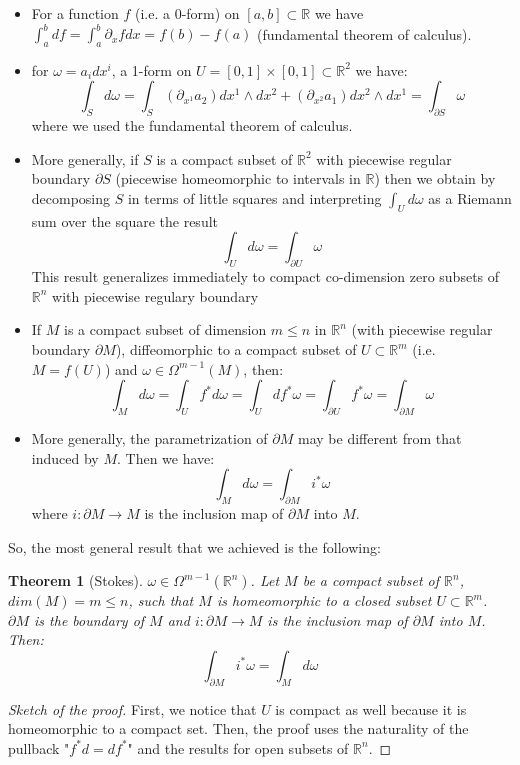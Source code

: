 \documentclass[a4paper,11pt,titlepage, article, oneside]{memoir}
\numberwithin{equation}{section}
\newtheorem{theorem}{Theorem}[section]
\theoremstyle{definition}
\theoremstyle{remark}
\newcommand{\rfield}{\mathbb{R}}
\begin{document}
\begin{itemize}
  \item For a function $f$ (i.e. a 0-form) on $[a, b] \subset \rfield$ we have $\int_a^b df = \int_a^b \partial_x f dx = f(b) - f(a)$ (fundamental theorem of calculus).
  \item for $\omega = a_i dx^i$, a 1-form on $U = [0, 1] \times [0, 1] \subset \rfield^2$ we have:
  $$\int_S d\omega = \int_S (\partial_{x^1} a_2) dx^1 \wedge dx^2 + (\partial_{x^2} a_1) dx^2 \wedge dx^1 = \int_{\partial S} \omega$$
  where we used the fundamental theorem of calculus.
  \item More generally, if $S$ is a compact subset of $\rfield^2$ with piecewise regular boundary $\partial S$ (piecewise homeomorphic to intervals in $\rfield$) then we obtain by decomposing $S$ in terms of little squares and interpreting $\int_U d\omega$ as a Riemann sum over the square the result
  $$\int_U d\omega = \int_{\partial U} \omega$$
  This result generalizes immediately to compact co-dimension zero subsets of $\rfield^n$ with piecewise regulary boundary
  \item If $M$ is a compact subset of dimension $m \le n$ in $\rfield^n$ (with piecewise regular boundary $\partial M$), diffeomorphic to a compact subset of $U \subset \rfield^m$ (i.e. $M = f(U)$) and $\omega \in \Omega^{m-1}(M)$, then:
  $$\int_M d\omega = \int_U f^* d\omega = \int_U df^* \omega = \int_{\partial U} f^* \omega = \int_{\partial M} \omega$$
  \item More generally, the parametrization of $\partial M$ may be different from that induced by $M$. Then we have:
  $$\int_M d\omega = \int_{\partial M} i^* \omega$$
  where $i \colon \partial M \rightarrow M$ is the inclusion map of $\partial M$ into $M$.
\end{itemize}

So, the most general result that we achieved is the following:

\begin{theorem}[Stokes]
  $\omega \in \Omega^{m-1}(\rfield^n)$. Let $M$ be a compact subset of $\rfield^n$, $dim(M) = m \le n$, such that $M$ is homeomorphic to a closed subset $U \subset \rfield^m$. $\partial M$ is the boundary of $M$ and $i \colon \partial M \rightarrow M$ is the inclusion map of $\partial M$ into $M$. Then:
  \begin{equation}
    \int_{\partial M} i^* \omega = \int_M d\omega
  \end{equation}
\end{theorem}
\begin{proof}[Sketch of the proof]
First, we notice that $U$ is compact as well because it is homeomorphic to a compact set.
Then, the proof uses the naturality of the pullback "$f^*d = df^*$" and the results for open subsets of $\rfield^n$. 
\end{proof}
\end{document}

